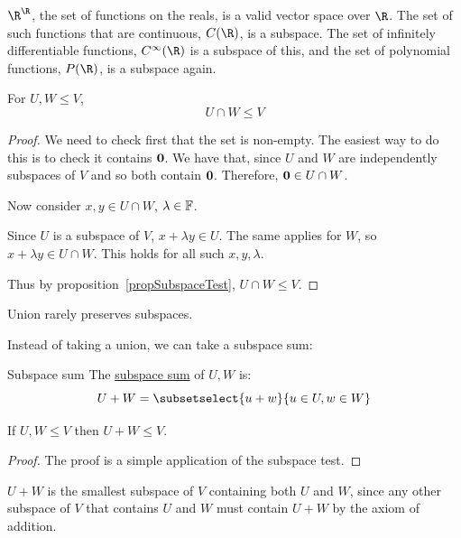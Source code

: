 \documentclass[../Main.tex]{subfiles}
\begin{document}
\begin{example}
    $\R^{\R}$, the set of functions on the reals, is a valid vector space over $\R$. The set of such functions that are continuous, $C(\R)$, is a subspace.
    The set of infinitely differentiable functions, $C^{\infty}(\R)$ is a subspace of this, and the set of polynomial functions, $P(\R)$, is a subspace again.
\end{example}
\begin{lemma}
    For $U, W \leq V$,
    \begin{equation*}
        U \cap W \leq V
    \end{equation*}
    \label{lemIntersectSubspace}
\end{lemma}
\begin{proof}
    We need to check first that the set is non-empty. The easiest way to do this is to check it contains $\boldsymbol{0}$. We have that, since $U$ and $W$ are independently subspaces of $V$ and so both contain $\boldsymbol{0}$. Therefore, $\boldsymbol{0} \in  U \cap W$.

    Now consider $x, y \in U \cap W$, $\lambda \in \mathbb{F}$.

    Since $U$ is a subspace of $V$, $x + \lambda y \in U$. The same applies for $W$, so $x + \lambda y \in U \cap W$. This holds for all such $x, y, \lambda$.

    Thus by proposition~\ref{propSubspaceTest}, $U \cap W \leq V$.
\end{proof}
\begin{warning}
    Union rarely preserves subspaces.
\end{warning}
Instead of taking a union, we can take a subspace sum:
\begin{definition}{Subspace sum}
    The \underline{subspace sum} of $U, W$ is:
    \begin{equation*}
        U + W = \subsetselect{u + w}{u \in U, w \in W}
    \end{equation*}
\end{definition}
\begin{lemma}
    If $U, W \leq V$ then $U + W \leq V$.
    \label{lemSubspaceSum}
\end{lemma}
\begin{proof}
    The proof is a simple application of the subspace test.
\end{proof}
\begin{remark}
    $U + W$ is the smallest subspace of $V$ containing both $U$ and $W$, since any other subspace of $V$ that contains $U$ and $W$ must contain $U + W$ by the axiom of addition.
\end{remark}
\end{document}
